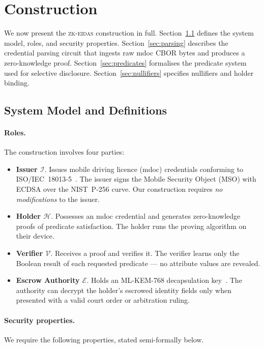 \section{Construction}\label{sec:construction}

We now present the \textsc{zk-eidas} construction in full.
Section~\ref{sec:model} defines the system model, roles, and security properties.
Section~\ref{sec:parsing} describes the credential parsing circuit that ingests raw mdoc CBOR bytes and produces a zero-knowledge proof.
Section~\ref{sec:predicates} formalises the predicate system used for selective disclosure.
Section~\ref{sec:nullifiers} specifies nullifiers and holder binding.

\subsection{System Model and Definitions}\label{sec:model}

\paragraph{Roles.}
The construction involves four parties:
\begin{itemize}
  \item \textbf{Issuer $\mathcal{I}$}. Issues mobile driving licence (mdoc) credentials conforming to ISO/IEC~18013-5~\cite{iso18013}. The issuer signs the Mobile Security Object (MSO) with ECDSA over the NIST~P-256 curve. Our construction requires \emph{no modifications} to the issuer.
  \item \textbf{Holder $\mathcal{H}$}. Possesses an mdoc credential and generates zero-knowledge proofs of predicate satisfaction. The holder runs the proving algorithm on their device.
  \item \textbf{Verifier $\mathcal{V}$}. Receives a proof and verifies it. The verifier learns only the Boolean result of each requested predicate --- no attribute values are revealed.
  \item \textbf{Escrow Authority $\mathcal{E}$}. Holds an ML-KEM-768 decapsulation key~\cite{fips203}. The authority can decrypt the holder's escrowed identity fields only when presented with a valid court order or arbitration ruling.
\end{itemize}

\paragraph{Security properties.}
We require the following properties, stated semi-formally below.

